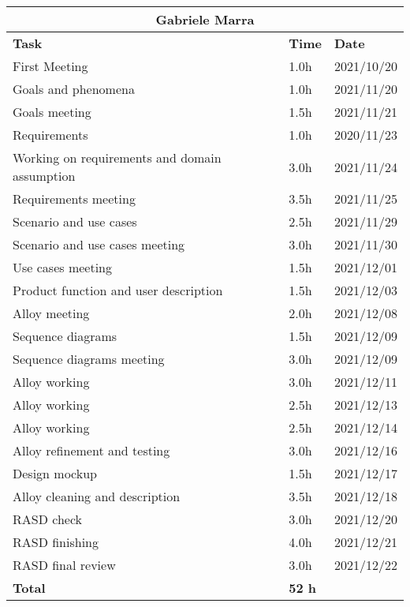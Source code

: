 
\begin{table}[!ht]
\centering
\begin{tabular}{|p{}|p{}|p{}|}
\hline
\multicolumn{3}{|c|}{\textbf{Gabriele Marra}}            \\ \hline
\textbf{Task}                   & \textbf{Time} & \textbf{Date} \\ \hline

First Meeting				&		1.0h	   &	2021/10/20 \\ \hline
Goals and phenomena			&		1.0h	   & 	2021/11/20 \\ \hline
Goals meeting					&		1.5h	   &	2021/11/21 \\ \hline
Requirements		&		1.0h	   &	2020/11/23 \\ \hline
Working on requirements and domain assumption			&		3.0h	   &	2021/11/24 \\ \hline
Requirements  meeting		&		3.5h	   &	2021/11/25 \\ \hline
Scenario and use cases		&		2.5h    &   	2021/11/29 \\ \hline
Scenario and use cases meeting		&		3.0h	   & 	2021/11/30 \\ \hline
Use cases meeting		&		1.5h	   & 	2021/12/01 \\ \hline
Product function and user description		&		1.5h	   & 	2021/12/03 \\ \hline
Alloy meeting				&		2.0h     &	2021/12/08 \\ \hline
Sequence diagrams			&		1.5h	  &	2021/12/09 \\ \hline
Sequence diagrams meeting				&		3.0h	   & 	2021/12/09 \\ \hline
Alloy working				&		3.0h	  &    2021/12/11 \\ \hline 
Alloy working				&		2.5h	  &    2021/12/13 \\ \hline 
Alloy working				&		2.5h	  &    2021/12/14 \\ \hline 
Alloy refinement and testing		&		3.0h	  &    2021/12/16 \\ \hline
Design mockup			&		1.5h	  &    2021/12/17 \\ \hline 
Alloy cleaning and description		&		3.5h	  &    2021/12/18 \\ \hline
RASD check				&		3.0h   &	2021/12/20 \\ \hline
RASD finishing				&		4.0h	  &    2021/12/21  \\ \hline
RASD final review			&		3.0h	  &    2021/12/22  \\ \hline
\textbf{Total}                  		&  \textbf{52 h}   & \\ \hline
\end{tabular}
\end{table}


